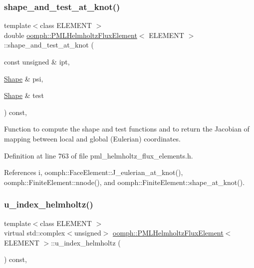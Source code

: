 \subsubsection{\texorpdfstring{shape\+\_\+and\+\_\+test\+\_\+at\+\_\+knot()}{shape\_and\_test\_at\_knot()}}
{\footnotesize\ttfamily template$<$class E\+L\+E\+M\+E\+NT $>$ \\
double \hyperlink{classoomph_1_1PMLHelmholtzFluxElement}{oomph\+::\+P\+M\+L\+Helmholtz\+Flux\+Element}$<$ E\+L\+E\+M\+E\+NT $>$\+::shape\+\_\+and\+\_\+test\+\_\+at\+\_\+knot (\begin{DoxyParamCaption}\item[{const unsigned \&}]{ipt,  }\item[{\hyperlink{classoomph_1_1Shape}{Shape} \&}]{psi,  }\item[{\hyperlink{classoomph_1_1Shape}{Shape} \&}]{test }\end{DoxyParamCaption}) const\hspace{0.3cm}{\ttfamily [inline]}, {\ttfamily [protected]}}



Function to compute the shape and test functions and to return the Jacobian of mapping between local and global (Eulerian) coordinates. 



Definition at line 763 of file pml\+\_\+helmholtz\+\_\+flux\+\_\+elements.\+h.



References i, oomph\+::\+Face\+Element\+::\+J\+\_\+eulerian\+\_\+at\+\_\+knot(), oomph\+::\+Finite\+Element\+::nnode(), and oomph\+::\+Finite\+Element\+::shape\+\_\+at\+\_\+knot().

\mbox{\label{classoomph_1_1PMLHelmholtzFluxElement_a2c3019be4606aa2e67209f1dd7c3bb60}} 
\subsubsection{\texorpdfstring{u\+\_\+index\+\_\+helmholtz()}{u\_index\_helmholtz()}}
{\footnotesize\ttfamily template$<$class E\+L\+E\+M\+E\+NT $>$ \\
virtual std\+::complex$<$unsigned$>$ \hyperlink{classoomph_1_1PMLHelmholtzFluxElement}{oomph\+::\+P\+M\+L\+Helmholtz\+Flux\+Element}$<$ E\+L\+E\+M\+E\+NT $>$\+::u\+\_\+index\+\_\+helmholtz (\begin{DoxyParamCaption}{ }\end{DoxyParamCaption}) const\hspace{0.3cm}{\ttfamily [inline]}, {\ttfamily [virtual]}}




